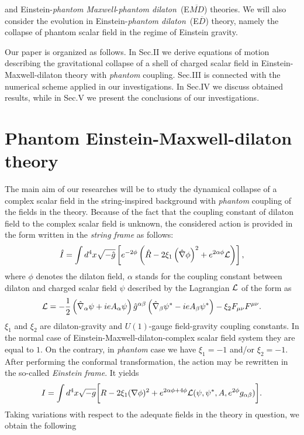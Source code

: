 \documentclass[aps,showpacs,nofootinbib,floatfix]{revtex4}
\newcommand{\be}{\begin{equation}}
\newcommand{\ee}{\end{equation}}
\newcommand{\cL}{{\cal L}}
\newcommand{\na}{\nabla}
\newcommand{\hI}{\hat I}
\newcommand{\hg}{\hat g}
\newcommand{\hR}{\hat R}
\newcommand{\hna}{\hat \nabla}
\newcommand{\zpsi}{\psi^{\ast}}
\begin{document}
and Einstein-{\it phantom Maxwell}-{\it phantom dilaton}~(E$\overline{MD}$) theories. 
We will also consider the evolution in Einstein-{\it phantom dilaton}~(E$\overline{D}$) theory, 
namely the collapse of phantom scalar field in the regime of Einstein gravity.
\par
Our paper is organized as follows. In Sec.II
we derive equations of motion describing the gravitational collapse of a shell of charged scalar field in
Einstein-Maxwell-dilaton theory with {\it phantom} coupling. Sec.III is connected with the numerical scheme applied
in our investigations. In Sec.IV we discuss obtained results, while in Sec.V we present the conclusions of 
our investigations.




\section{Phantom Einstein-Maxwell-dilaton theory}
The main aim of our researches will be to study the dynamical collapse of a complex scalar field in the string-inspired background
with {\it phantom} coupling of the fields in the theory.
Because of the fact that the coupling constant of dilaton field to the complex scalar field is unknown, the 
considered action is provided in the form written in the {\it string frame} as follows:
\be
\hI = \int d^{4} x \sqrt{- \hg} \left [ e^{- 2 \phi}
\left (
\hR - 2 \xi_1 \left ( \hna \phi \right )^2 + e^{ 2 \alpha \phi} \cL \right )
\right ],
\label{a1}
\ee
where $\phi$ denotes the dilaton field, $\alpha$ stands for the coupling constant between dilaton 
and charged scalar field $\psi$ described by the Lagrangian $\cL$ of the form as
\be
\cL = - {1 \over 2} \left (
\hna_{\alpha} \psi + i e A_{\alpha} \psi \right ) \hg^{\alpha \beta}
\left (
\hna_{\beta} \zpsi - i e A_{\beta} \zpsi \right ) - \xi_2 F_{\mu \nu}
F^{\mu \nu} .
\ee
$\xi_1$ and $\xi_2$ are dilaton-gravity and $U(1)$-gauge field-gravity coupling constants. 
In the normal case of Einstein-Maxwell-dilaton-complex scalar field system they are equal to $1$. On the contrary,
in {\it phantom} case we have $\xi_1 = -1$ and/or $\xi_2 = -1$. After performing the conformal transformation,
the action may be rewritten in the so-called {\it Einstein frame}.
It yields 
\be
I = \int d^{4} x \sqrt{-g} \bigg[
R - 2 \xi_1 ( \na \phi )^{2} + e^{2 \alpha \phi + 4 \phi} \cL
(\psi, \zpsi, A, e^{2 \phi} g_{\alpha \beta}) \bigg].
\ee
Taking variations with respect to the adequate fields in the theory in question, we obtain the following
\end{document}
